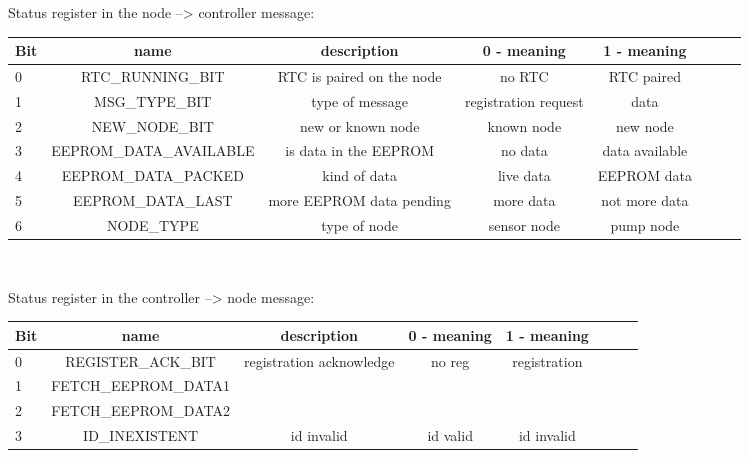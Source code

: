 \documentclass[12pt,a4paper,titlepage,oneside]{article}
\begin{document}
Status register in the node --> controller message:

\begin{table}[htbp]
        \small
        \setlength\tabcolsep{2pt}
\begin{tabular}{ l c c c c c c r }
  Bit & name & description & 0 - meaning & 1 - meaning\\ \hline
  0 & RTC\_RUNNING\_BIT & RTC is paired on the node & no RTC & RTC paired \\ \hline
  1 & MSG\_TYPE\_BIT & type of message & registration request & data \\ \hline
  2 & NEW\_NODE\_BIT & new or known node & known node & new node \\ \hline
  3 & EEPROM\_DATA\_AVAILABLE & is data in the EEPROM & no data & data available\\ \hline
  4 & EEPROM\_DATA\_PACKED & kind of data & live data & EEPROM data\\ \hline
  5 & EEPROM\_DATA\_LAST & more EEPROM data pending & more data & not more data \\ \hline
  6 & NODE\_TYPE & type of node & sensor node & pump node\\ \hline
\end{tabular}\\
\end{table}


Status register in the controller --> node message:


\begin{table}[htbp]
        \small
        \setlength\tabcolsep{2pt}
\begin{tabular}{ l c c c c c c r }
  Bit & name & description & 0 - meaning & 1 - meaning\\ \hline
  0 & REGISTER\_ACK\_BIT & registration acknowledge & no reg & registration\\ \hline
  1 & FETCH\_EEPROM\_DATA1 & &  &  \\ \hline
  2 & FETCH\_EEPROM\_DATA2 &  & &  \\ \hline
  3 & ID\_INEXISTENT & id invalid & id valid & id invalid\\ \hline
\end{tabular}\\
\end{table}
\end{document}
